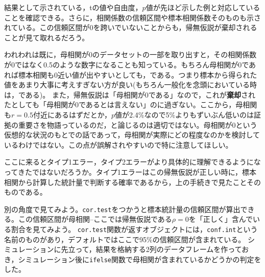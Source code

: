 \documentclass[
  a4paper,
]{ltjsbook}
\begin{document}
結果として示されている，tの値や自由度，\(p\)値が先ほど示した例と対応していることを確認できる。さらに，相関係数の信頼区間や標本相関係数そのものも示されている。この信頼区間が0を跨いでいないことからも，帰無仮説が棄却されることが見て取れるだろう。

われわれは既に，母相関が0のデータセットの一部を取り出すと，その相関係数が0ではなく0.5のような数字になることも知っている。もちろん母相関が0であれば標本相関も0近い値が出やすいとしても，である。つまり標本から得られた値をあまり大事に考えすぎない方が良い(もちろん一般化を念頭においている時は，である)。
また，帰無仮説は「母相関が0である」なので，これが\textbf{棄却}されたとしても「母相関が0であるとは言えない」のに過ぎない。ここから，母相関も\(r=0.5\)付近にあるはずだとか，\(p\)値が2.4\%なので5\%よりもずいぶん低いのは証拠の重要さを物語っているのだ，と論じるのは適切ではない。母相関が0という仮想的な状況のもとでの話であって，母相関が実際にどの程度なのかを検討しているわけではない。この点が誤解されやすいので特に注意してほしい。

ここに来るとタイプ1エラー，タイプ2エラーがより具体的に理解できるようになってきたではないだろうか。タイプ1エラーはこの帰無仮説が正しい時に，標本相関から計算した統計量で判断する確率であるから，上の手続きで見たことそのものである。

別の角度で見てみよう。\texttt{cor.test}をつかうと標本統計量の信頼区間が算出できる。この信頼区間が母相関--ここでは帰無仮説である\(\rho =0\)を「正しく」含んでいる割合を見てみよう。
\texttt{cor.test}関数が返すオブジェクトには，\texttt{conf.int}という名前のものがあり，デフォルトではここで95\%の信頼区間が含まれている。
シミュレーションに先立って，結果を格納する2列のデータフレームを作っておき，シミュレーション後に\texttt{ifelse}関数で母相関が含まれているかどうかの判定をした。
\end{document}
